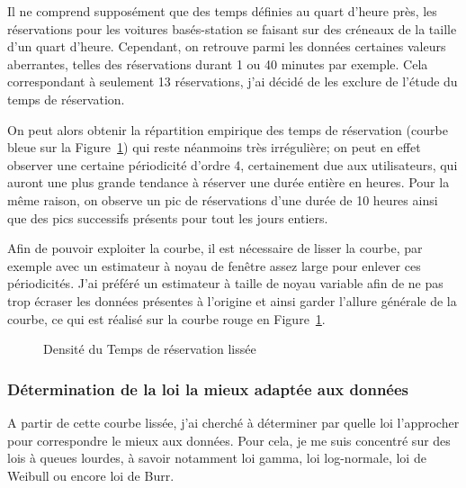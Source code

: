 \documentclass[12pt,a4paper]{article}
\newcommand{\1}[1]{\mathbbm{1}_{\{#1\}} }
\theoremstyle{definition}
\begin{document}
{Il ne comprend supposément que des temps définies au quart d'heure près, les réservations pour les voitures basés-station se faisant sur des créneaux de la taille d'un quart d'heure. Cependant, on retrouve parmi les données certaines valeurs aberrantes, telles des réservations durant 1 ou 40 minutes par exemple.  Cela correspondant à seulement 13 réservations, j'ai décidé de les exclure de l'étude du temps de réservation.

On peut alors obtenir la répartition empirique des temps de réservation (courbe bleue sur la Figure~\ref{lissage_courbe}) qui reste néanmoins très irrégulière; on peut en effet observer une certaine périodicité d'ordre 4, certainement due aux utilisateurs, qui auront une plus grande tendance à réserver une durée entière en heures. Pour la même raison, on observe un pic de réservations d'une durée de 10 heures ainsi que des pics successifs présents pour tout les jours entiers.

Afin de pouvoir exploiter la courbe, il est nécessaire de lisser la courbe, par exemple avec un estimateur à noyau de fenêtre assez large pour enlever ces périodicités. J'ai préféré un estimateur à taille de noyau variable afin de ne pas trop écraser les données présentes à l'origine et ainsi garder l'allure générale de la courbe, ce qui est réalisé sur la courbe rouge en Figure~\ref{lissage_courbe}.


\begin{figure} [h]
\centering
{}
\caption{Densité du Temps de réservation lissée}
\label{lissage_courbe}
\end{figure}


\subsubsection{Détermination de la loi la mieux adaptée aux données}

A partir de cette courbe lissée, j'ai cherché à déterminer par quelle loi l'approcher pour correspondre le mieux aux données. Pour cela, je me suis concentré sur des lois à queues lourdes, à savoir notamment loi gamma, loi log-normale, loi de Weibull ou encore loi de Burr.

}
\end{document}
